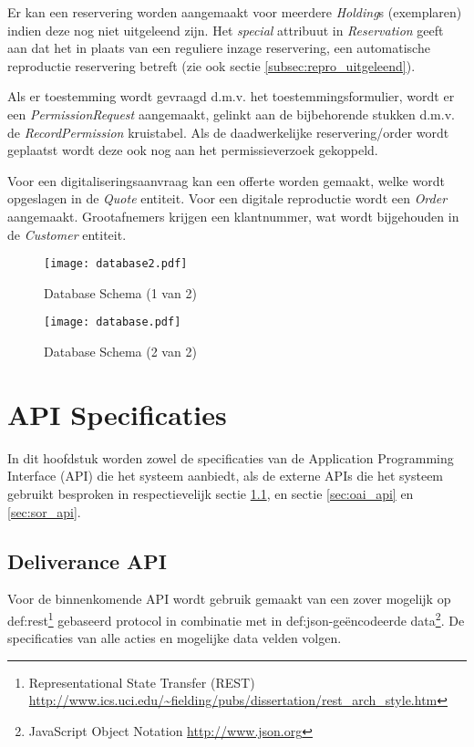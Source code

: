 \documentclass[a4paper,titlepage]{report}
\begin{document}
Er kan een reservering worden aangemaakt voor meerdere \emph{Holding}s
(exemplaren) indien deze nog
niet uitgeleend zijn. Het \emph{special} attribuut in \emph{Reservation} geeft
aan dat het in plaats van een reguliere inzage reservering, een automatische
reproductie reservering betreft (zie ook sectie \ref{subsec:repro_uitgeleend}).

Als er toestemming wordt gevraagd d.m.v. het toestemmingsformulier, wordt er
een \emph{PermissionRequest} aangemaakt, gelinkt aan de bijbehorende stukken
d.m.v. de \emph{RecordPermission} kruistabel. Als de daadwerkelijke
reservering/order wordt geplaatst wordt deze ook nog aan het permissieverzoek
gekoppeld.

Voor een digitaliseringsaanvraag kan een offerte worden gemaakt, welke wordt
opgeslagen in de \emph{Quote} entiteit. Voor een digitale reproductie wordt
een \emph{Order} aangemaakt. Grootafnemers krijgen een klantnummer, wat wordt
bijgehouden in de \emph{Customer} entiteit.


  \begin{figure}[H]
    \label{fig:db2}
    \centering
    \texttt{[image: database2.pdf]}
    \caption{Database Schema (1 van 2)}
  \end{figure}


  \begin{figure}[H]
    \label{fig:db}
    \centering
    \texttt{[image: database.pdf]}
    \caption{Database Schema (2 van 2)}
  \end{figure}
  


\chapter{API Specificaties}
\label{cha:api}
In dit hoofdstuk worden zowel de specificaties van de Application Programming
Interface (API) die het systeem aanbiedt, als de externe APIs die het
systeem gebruikt besproken in
respectievelijk sectie \ref{sec:resev}, en sectie \ref{sec:oai_api} en
\ref{sec:sor_api}.

  \section{Deliverance API}
  \label{sec:resev}
    Voor de binnenkomende API wordt gebruik gemaakt van een zover mogelijk op
    \gls{def:rest}\footnote{Representational State Transfer (REST)
 \url{http://www.ics.uci.edu/~fielding/pubs/dissertation/rest_arch_style.htm}}
    gebaseerd protocol in combinatie met in \gls{def:json}-ge\"encodeerde
    data\footnote{JavaScript Object Notation \url{http://www.json.org}}. De
    specificaties van alle acties en mogelijke data velden volgen.
\end{document}
